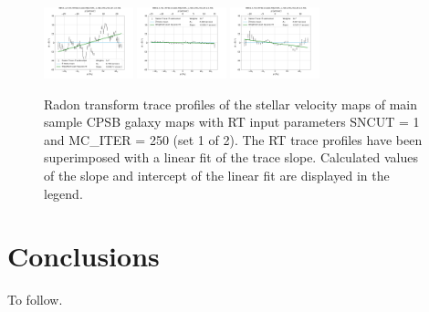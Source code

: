 \documentclass[fleqn,usenatbib]{mnras}
\begin{document}
\begin{figure}
    \includegraphics[width=0.23\textwidth]{Images/WLSFITS/CPSB/9493-12705.png}
    \includegraphics[width=0.23\textwidth]{Images/WLSFITS/CPSB/9494-3701.png}
    \includegraphics[width=0.23\textwidth]{Images/WLSFITS/CPSB/9494-3703.png}
%
    \caption{Radon transform trace profiles of the stellar velocity maps of main sample CPSB galaxy maps with RT input parameters SNCUT = 1 and MC\_ITER = 250 (set 1 of 2). The RT trace profiles have been superimposed with a linear fit of the trace slope. Calculated values of the slope and intercept of the linear fit are displayed in the legend.}
    \label{fig:Radon-traces-CPSB-LINFITS-1}
\end{figure}



\section{Conclusions}
\label{sec:conclusions}

To follow.










%




\bsp	%
\label{lastpage}
\end{document}
